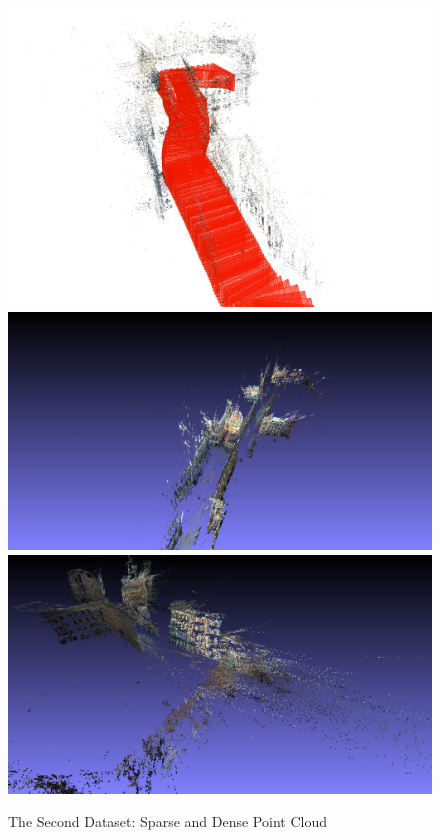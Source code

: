 \documentclass[11pt]{article}
\begin{document}
    \begin{figure}
    \caption{The Second Dataset: Sparse and Dense Point Cloud}
    \centering
    \includegraphics[width=\textwidth,height=\textheight,keepaspectratio]{images/2.ply.sparse.png}
    \includegraphics[width=\textwidth,height=\textheight,keepaspectratio]{images/2.ply.dense.1.png}
    \includegraphics[width=\textwidth,height=\textheight,keepaspectratio]{images/2.ply.dense.2.png}
    \label{fig:2ply}
    \end{figure}
\end{document}
